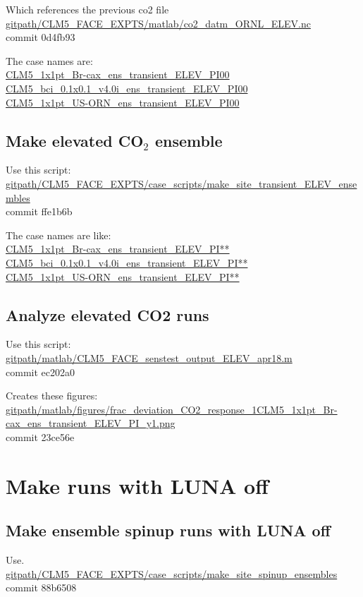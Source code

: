 \documentclass{article}
\begin{document}
Which references the previous co2 file\\
{\color{red}\small{\url{gitpath/CLM5_FACE_EXPTS/matlab/co2_datm_ORNL_ELEV.nc}}}\\
commit 0d4fb93

The case names are:\\
{\color{cyan}\small{\url{CLM5_1x1pt_Br-cax_ens_transient_ELEV_PI00}}}\\
{\color{cyan}\small{\url{CLM5_bci_0.1x0.1_v4.0i_ens_transient_ELEV_PI00}}}\\
{\color{cyan}\small{\url{CLM5_1x1pt_US-ORN_ens_transient_ELEV_PI00}}}

\subsection{Make elevated CO$_{2}$ ensemble}
Use this script:\\
{\color{blue}\small{\url{gitpath/CLM5_FACE_EXPTS/case_scripts/make_site_transient_ELEV_ensembles}}}\\
commit ffe1b6b 

The case names are like:\\
{\color{cyan}\small{\url{CLM5_1x1pt_Br-cax_ens_transient_ELEV_PI**}}}\\
{\color{cyan}\small{\url{CLM5_bci_0.1x0.1_v4.0i_ens_transient_ELEV_PI**}}}\\
{\color{cyan}\small{\url{CLM5_1x1pt_US-ORN_ens_transient_ELEV_PI**}}} 

\subsection{Analyze elevated CO2 runs}
Use this script:\\
{\color{blue}\small{\url{gitpath/matlab/CLM5_FACE_senstest_output_ELEV_apr18.m}}}\\
commit ec202a0  

Creates these figures:
{\color{magenta}\small{\url{gitpath/matlab/figures/frac_deviation_CO2_response_1CLM5_1x1pt_Br-cax_ens_transient_ELEV_PI_y1.png}}}\\
commit 23ce56e

\section{Make runs with LUNA off}

\subsection{Make ensemble spinup runs with LUNA off}
Use.\\
{\color{blue}\small{\url{gitpath/CLM5_FACE_EXPTS/case_scripts/make_site_spinup_ensembles}} }\\
commit 88b6508    
\end{document}
